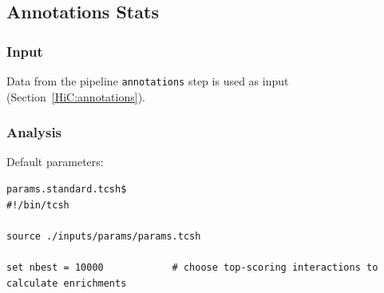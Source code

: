 \subsection{Annotations Stats}\label{HiC:annotations-stats}%
\subsubsection{Input} %
Data from the pipeline \texttt{annotations} step is used as input (Section~\ref{HiC:annotations}).
\subsubsection{Analysis} %
Default parameters:
\begin{lstlisting}
params.standard.tcsh$
#!/bin/tcsh

source ./inputs/params/params.tcsh

set nbest = 10000            # choose top-scoring interactions to calculate enrichments
\end{lstlisting}
